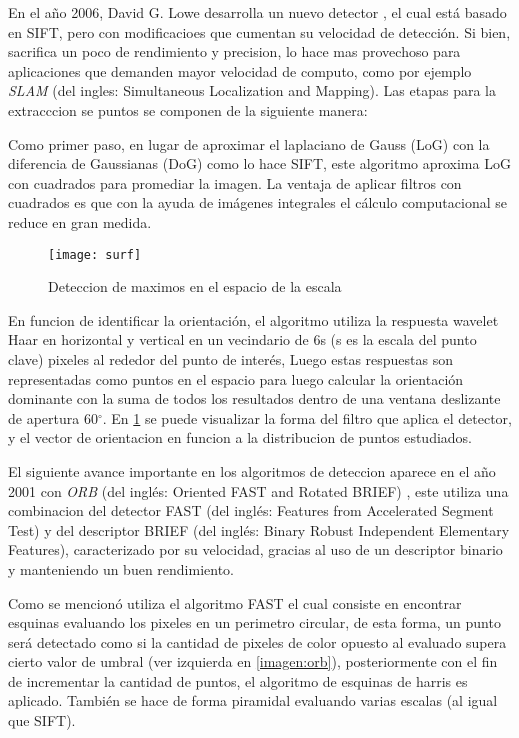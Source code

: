 En el año 2006, David G. Lowe desarrolla un nuevo detector \cite{surf}, el cual está basado en SIFT, pero con modificacioes que cumentan su velocidad de detección. Si bien, sacrifica un poco de rendimiento y precision, lo hace mas provechoso para aplicaciones que demanden mayor velocidad de computo, como por ejemplo \textit{SLAM} (del ingles: Simultaneous Localization and Mapping). Las etapas para la extracccion se puntos se componen de la siguiente manera:

Como primer paso, en lugar de aproximar el laplaciano de Gauss (LoG) con la diferencia de Gaussianas (DoG) como lo hace SIFT, este algoritmo aproxima LoG con cuadrados para promediar la imagen. La ventaja de aplicar filtros con cuadrados es que con la ayuda de imágenes integrales el cálculo computacional se reduce en gran medida.

\begin{figure}[H]
	\centering
	\texttt{[image: surf]}
	\caption[SURF - Espacio de escalas]{Deteccion de maximos en el espacio de la escala}
	\label{imagen:surf}
\end{figure}

En funcion de identificar la orientación, el algoritmo utiliza la respuesta wavelet Haar en horizontal y vertical en un vecindario de 6s (s es la escala del punto clave) pixeles al rededor del punto de interés, Luego estas respuestas son representadas como puntos en el espacio para luego calcular la orientación dominante con la suma de todos los resultados dentro de una ventana deslizante de apertura 60$^\circ$. En \ref{imagen:surf} se puede visualizar la forma del filtro que aplica el detector, y el vector de orientacion en funcion a la distribucion de puntos estudiados.

El siguiente avance importante en los algoritmos de deteccion aparece en el año 2001 con \textit{ORB} (del inglés: Oriented FAST and Rotated BRIEF) \cite{orb}, este utiliza una combinacion del detector FAST (del inglés: Features from Accelerated Segment Test) y del descriptor BRIEF (del inglés: Binary Robust Independent Elementary Features), caracterizado por su velocidad, gracias al uso de un descriptor binario y manteniendo un buen rendimiento. 

Como se mencionó utiliza el algoritmo FAST el cual consiste en encontrar esquinas evaluando los pixeles en un perimetro circular, de esta forma, un punto será detectado como si la cantidad de pixeles de color opuesto al evaluado supera cierto valor de umbral (ver izquierda en \ref{imagen:orb}), posteriormente con el fin de incrementar la cantidad de puntos, el algoritmo de esquinas de harris es aplicado. También se hace de forma piramidal evaluando varias escalas (al igual que SIFT).

